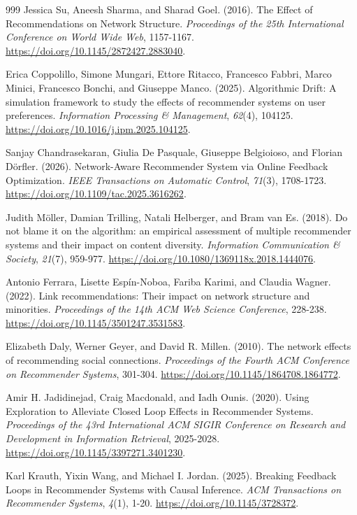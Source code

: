 \begin{thebibliography}{999}
Jessica Su, Aneesh Sharma, and Sharad Goel. (2016). The Effect of Recommendations on Network Structure. \textit{Proceedings of the 25th International Conference on World Wide Web}, 1157-1167. \url{https://doi.org/10.1145/2872427.2883040}.

Erica Coppolillo, Simone Mungari, Ettore Ritacco, Francesco Fabbri, Marco Minici, Francesco Bonchi, and Giuseppe Manco. (2025). Algorithmic Drift: A simulation framework to study the effects of recommender systems on user preferences. \textit{Information Processing \& Management}, \textit{62}(4), 104125. \url{https://doi.org/10.1016/j.ipm.2025.104125}.

Sanjay Chandrasekaran, Giulia De Pasquale, Giuseppe Belgioioso, and Florian D\"{o}rfler. (2026). Network-Aware Recommender System via Online Feedback Optimization. \textit{IEEE Transactions on Automatic Control}, \textit{71}(3), 1708-1723. \url{https://doi.org/10.1109/tac.2025.3616262}.

Judith M\"{o}ller, Damian Trilling, Natali Helberger, and Bram van Es. (2018). Do not blame it on the algorithm: an empirical assessment of multiple recommender systems and their impact on content diversity. \textit{Information Communication \& Society}, \textit{21}(7), 959-977. \url{https://doi.org/10.1080/1369118x.2018.1444076}.

Antonio Ferrara, Lisette Esp\'{i}n-Noboa, Fariba Karimi, and Claudia Wagner. (2022). Link recommendations: Their impact on network structure and minorities. \textit{Proceedings of the 14th ACM Web Science Conference}, 228-238. \url{https://doi.org/10.1145/3501247.3531583}.

Elizabeth Daly, Werner Geyer, and David R. Millen. (2010). The network effects of recommending social connections. \textit{Proceedings of the Fourth ACM Conference on Recommender Systems}, 301-304. \url{https://doi.org/10.1145/1864708.1864772}.

Amir H. Jadidinejad, Craig Macdonald, and Iadh Ounis. (2020). Using Exploration to Alleviate Closed Loop Effects in Recommender Systems. \textit{Proceedings of the 43rd International ACM SIGIR Conference on Research and Development in Information Retrieval}, 2025-2028. \url{https://doi.org/10.1145/3397271.3401230}.

Karl Krauth, Yixin Wang, and Michael I. Jordan. (2025). Breaking Feedback Loops in Recommender Systems with Causal Inference. \textit{ACM Transactions on Recommender Systems}, \textit{4}(1), 1-20. \url{https://doi.org/10.1145/3728372}.


\end{thebibliography}
